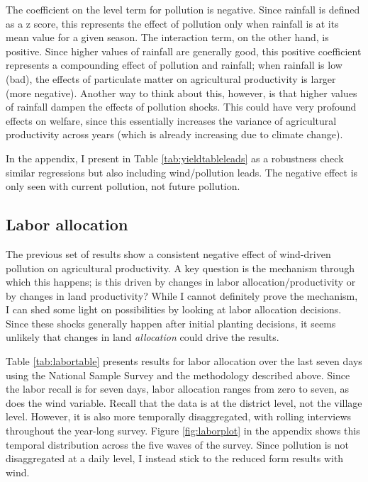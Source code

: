 \documentclass[
]{article}
\begin{document}
The coefficient on the level term for pollution is negative. Since rainfall is defined as a z score, this represents the effect of pollution only when rainfall is at its mean value for a given season. The interaction term, on the other hand, is positive. Since higher values of rainfall are generally good, this positive coefficient represents a compounding effect of pollution and rainfall; when rainfall is low (bad), the effects of particulate matter on agricultural productivity is larger (more negative). Another way to think about this, however, is that higher values of rainfall dampen the effects of pollution shocks. This could have very profound effects on welfare, since this essentially increases the variance of agricultural productivity across years (which is already increasing due to climate change).

In the appendix, I present in Table \ref{tab:yieldtableleads} as a robustness check similar regressions but also including wind/pollution leads. The negative effect is only seen with current pollution, not future pollution.

\hypertarget{labor-allocation}{%
\subsection{Labor allocation}\label{labor-allocation}}

The previous set of results show a consistent negative effect of wind-driven pollution on agricultural productivity. A key question is the mechanism through which this happens; is this driven by changes in labor allocation/productivity or by changes in land productivity? While I cannot definitely prove the mechanism, I can shed some light on possibilities by looking at labor allocation decisions. Since these shocks generally happen after initial planting decisions, it seems unlikely that changes in land \emph{allocation} could drive the results.

Table \ref{tab:labortable} presents results for labor allocation over the last seven days using the National Sample Survey and the methodology described above. Since the labor recall is for seven days, labor allocation ranges from zero to seven, as does the wind variable. Recall that the data is at the district level, not the village level. However, it is also more temporally disaggregated, with rolling interviews throughout the year-long survey. Figure \ref{fig:laborplot} in the appendix shows this temporal distribution across the five waves of the survey. Since pollution is not disaggregated at a daily level, I instead stick to the reduced form results with wind.
\end{document}
